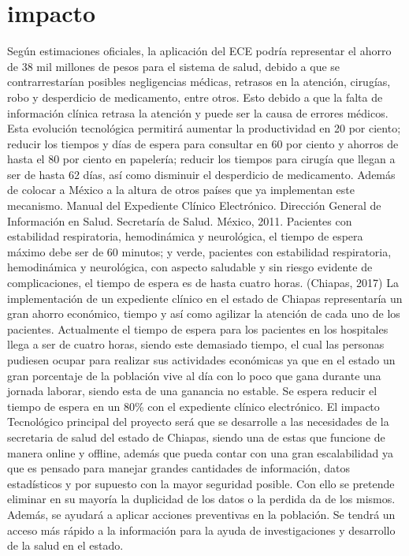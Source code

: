 \chapter{impacto}

Según estimaciones oficiales, la aplicación del ECE podría representar el ahorro de 38 mil millones de pesos para el sistema de salud, debido a que se contrarrestarían posibles negligencias médicas, retrasos en la atención, cirugías, robo y desperdicio de medicamento, entre otros. Esto debido a que la falta de información clínica retrasa la atención y puede ser la causa de errores médicos. Esta evolución tecnológica permitirá aumentar la productividad en 20 por ciento; reducir los tiempos y días de espera para consultar en 60 por ciento y ahorros de hasta el 80 por ciento en papelería; reducir los tiempos para cirugía que llegan a ser de hasta 62 días, así como disminuir el desperdicio de medicamento. Además de colocar a México a la altura de otros países que ya implementan este mecanismo. Manual del Expediente Clínico Electrónico. Dirección General de Información en Salud. Secretaría de Salud. México, 2011.
Pacientes con estabilidad respiratoria, hemodinámica y neurológica, el tiempo de espera máximo debe ser de 60 minutos; y verde, pacientes con estabilidad respiratoria, hemodinámica y neurológica, con aspecto saludable y sin riesgo evidente de complicaciones, el tiempo de espera es de hasta cuatro horas. (Chiapas, 2017)
La implementación de un expediente clínico en el estado de Chiapas representaría un gran ahorro económico, tiempo y así como agilizar la atención de cada uno de los pacientes. Actualmente el tiempo de espera para los pacientes en los hospitales llega a ser de cuatro horas, siendo este demasiado tiempo, el cual las personas pudiesen ocupar para realizar sus actividades económicas ya que en el estado un gran porcentaje de la población vive al día con lo poco que gana durante una jornada laborar, siendo esta de una ganancia no estable. Se espera reducir el tiempo de espera en un 80\% con el expediente clínico electrónico.
El impacto Tecnológico principal del proyecto será que se desarrolle a las necesidades de la secretaria de salud del estado de Chiapas, siendo una de estas que funcione de manera online y offline, además que pueda contar con una gran escalabilidad ya que es pensado para manejar grandes cantidades de información, datos estadísticos y por supuesto con la mayor seguridad posible.  Con ello se pretende eliminar en su mayoría la duplicidad de los datos o la perdida da de los mismos. Además, se ayudará a aplicar acciones preventivas en la población. Se tendrá un acceso más rápido a la información para la ayuda de investigaciones y desarrollo de la salud en el estado.
